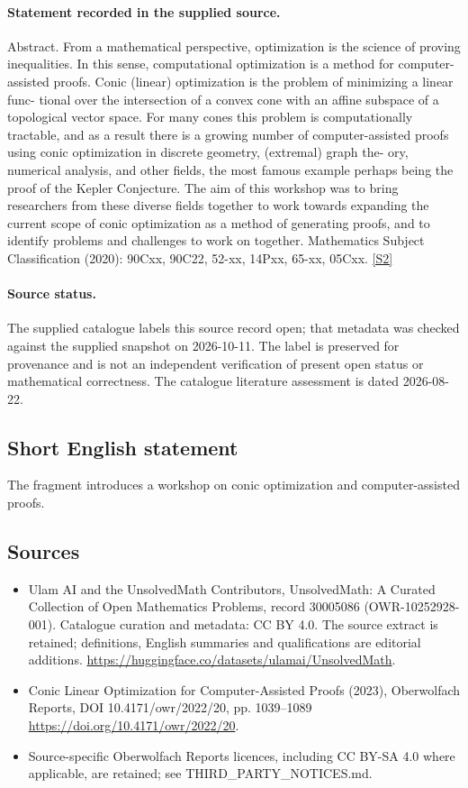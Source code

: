 \documentclass[11pt]{article}
\begin{document}
\paragraph{Statement recorded in the supplied source.}
Abstract. From a mathematical perspective, optimization is the science of proving inequalities. In this sense, computational optimization is a method for computer-assisted proofs. Conic (linear) optimization is the problem of minimizing a linear func- tional over the intersection of a convex cone with an affine subspace of a topological vector space. For many cones this problem is computationally tractable, and as a result there is a growing number of computer-assisted proofs using conic optimization in discrete geometry, (extremal) graph the- ory, numerical analysis, and other fields, the most famous example perhaps being the proof of the Kepler Conjecture. The aim of this workshop was to bring researchers from these diverse fields together to work towards expanding the current scope of conic optimization as a method of generating proofs, and to identify problems and challenges to work on together. Mathematics Subject Classification (2020): 90Cxx, 90C22, 52-xx, 14Pxx, 65-xx, 05Cxx. \href{https://doi.org/10.4171/owr/2022/20}{[S2]}
\paragraph{Source status.}
The supplied catalogue labels this source record open; that metadata was checked against the supplied snapshot on 2026-10-11. The label is preserved for provenance and is not an independent verification of present open status or mathematical correctness. The catalogue literature assessment is dated 2026-08-22.
\subsection{Short English statement}
The fragment introduces a workshop on conic optimization and computer-assisted proofs.
\subsection{Sources}
\begin{itemize}
\item[S1] Ulam AI and the UnsolvedMath Contributors, UnsolvedMath: A Curated Collection of Open Mathematics Problems, record 30005086 (OWR-10252928-001). Catalogue curation and metadata: CC BY 4.0. The source extract is retained; definitions, English summaries and qualifications are editorial additions.
\url{https://huggingface.co/datasets/ulamai/UnsolvedMath}.
\item[S2] Conic Linear Optimization for Computer-Assisted Proofs (2023), Oberwolfach Reports, DOI 10.4171/owr/2022/20, pp. 1039--1089
\url{https://doi.org/10.4171/owr/2022/20}.
\item Source-specific Oberwolfach Reports licences, including CC BY-SA 4.0 where applicable, are retained; see THIRD\_PARTY\_NOTICES.md.
\end{itemize}
\end{document}
